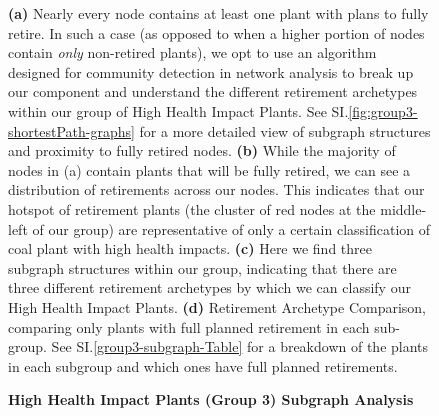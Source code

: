 \begin{figure}[H]
    \caption{\textbf{High Health Impact Plants (Group 3) Subgraph Analysis}}
    \medskip
    \footnotesize
    \textbf{(a)} Nearly every node contains at least one plant with plans to fully retire. In such a case (as opposed to when a higher portion of nodes contain \textit{only} non-retired plants),
    we opt to use an algorithm designed for community detection in network analysis to break up our component and understand the different retirement archetypes within
    our group of High Health Impact Plants. See SI.\ref{fig:group3-shortestPath-graphs} for a more detailed view of subgraph structures and proximity to fully retired nodes.
    \textbf{(b)} While the majority of nodes in (a) contain plants that will be fully retired, we can see a distribution of retirements across our nodes. This indicates that our hotspot of retirement plants (the cluster of red nodes at the middle-left of our group) 
    are representative of only a certain classification of coal plant with high health impacts.
    \textbf{(c)} Here we find three subgraph structures within our group, indicating that 
    there are three different retirement archetypes by which we can classify our High Health Impact Plants.
    \textbf{(d)} Retirement Archetype Comparison, comparing only plants with full planned retirement in each sub-group. See SI.\ref{group3-subgraph-Table} for a breakdown of the plants in each subgroup and which ones have full planned retirements.
\end{figure}



